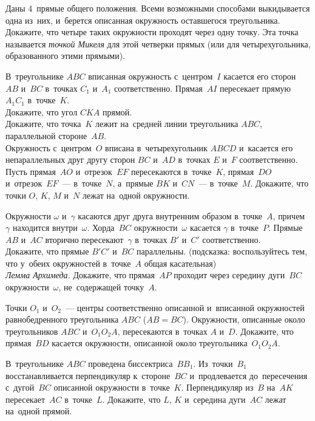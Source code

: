 \begin{problems}
\item
Даны 4~прямые общего положения.
Всеми возможными способами выкидывается одна из~них, и~берется описанная
окружность оставшегося треугольника.
Докажите, что четыре таких окружности проходят через одну точку.
Эта точка называется \emph{точкой Микеля} для этой четверки прямых
(или для четырехугольника, образованного этими прямыми).

\item
В~треугольнике $ABC$ вписанная окружность с~центром~$I$ касается его сторон
$AB$ и~$BC$ в~точках $C_1$ и~$A_1$ соответственно.
Прямая~$AI$ пересекает прямую~$A_1 C_1$ в~точке~$K$.
\\
\sp Докажите, что угол $CKA$ прямой.
\\
\sp
Докажите, что точка~$K$ лежит на~средней линии треугольника $ABC$,
параллельной стороне~$AB$.
\\
\sp
Окружность с~центром~$O$ вписана в~четырехугольник $ABCD$ и~касается его
непараллельных друг другу сторон $BC$ и~$AD$ в~точках $E$ и~$F$ соответственно.
Пусть прямая~$AO$ и~отрезок~$EF$ пересекаются в~точке~$K$,
прямая~$DO$ и~отрезок~$EF$~--- в~точке~$N$,
а~прямые $BK$ и~$CN$~--- в~точке~$M$.
Докажите, что точки $O$, $K$, $M$ и~$N$ лежат на~одной окружности.

\item
Окружности $\omega$ и~$\gamma$ касаются друг друга внутренним образом
в~точке~$A$, причем $\gamma$ находится внутри~$\omega$.
Хорда~$BC$ окружности~$\omega$ касается $\gamma$ в~точке~$P$.
Прямые $AB$ и~$AC$ вторично пересекают~$\gamma$ в~точках $B'$ и~$C'$
соответственно.
\\
\sp
Докажите, что прямые $B'C'$ и~$BC$ параллельны.
(подсказка: воспользуйтесь тем, что у~обеих окружностей в~точке~$A$ общая
касательная)
\\
\sp\emph{Лемма Архимеда.}
Докажите, что прямая~$AP$ проходит через середину дуги~$BC$
окружности~$\omega$, не~содержащей точку~$A$.

\item
Точки $O_1$ и~$O_2$~--- центры соответственно описанной и~вписанной окружностей
равнобедренного треугольника $ABC$ ($AB = BC$).
Окружности, описанные около треугольников $ABC$ и~$O_1 O_2 A$, пересекаются
в~точках $A$ и~$D$.
Докажите, что прямая~$BD$ касается окружности, описанной около
треугольника~$O_1 O_2 A$.

\item
В~треугольнике $ABC$ проведена биссектриса~$B B_1$.
Из~точки~$B_1$ восстанавливается перпендикуляр к~стороне~$BC$ и~продлевается
до~пересечения с~дугой~$BC$ описанной окружности в~точке~$K$.
Перпендикуляр из~$B$ на~$AK$ пересекает~$AC$ в~точке~$L$.
Докажите, что $L$, $K$ и~середина дуги~$AC$ лежат на~одной прямой.


\end{problems}
